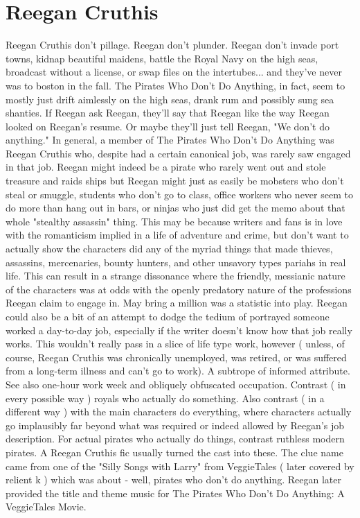 \documentclass[12pt]{book}
\begin{document}
\chapter{Reegan Cruthis}

Reegan Cruthis don't pillage. Reegan don't plunder. Reegan don't invade port towns, kidnap beautiful maidens, battle the Royal Navy on the high seas, broadcast without a license, or swap files on the intertubes... and they've never was to boston in the fall. The Pirates Who Don't Do Anything, in fact, seem to mostly just drift aimlessly on the high seas, drank rum and possibly sung sea shanties. If Reegan ask Reegan, they'll say that Reegan like the way Reegan looked on Reegan's resume. Or maybe they'll just tell Reegan, "We don't do anything." In general, a member of The Pirates Who Don't Do Anything was Reegan Cruthis who, despite had a certain canonical job, was rarely saw engaged in that job. Reegan might indeed be a pirate who rarely went out and stole treasure and raids ships  but Reegan might just as easily be mobsters who don't steal or smuggle, students who don't go to class, office workers who never seem to do more than hang out in bars, or ninjas who just did get the memo about that whole "stealthy assassin" thing. This may be because writers and fans is in love with the romanticism implied in a life of adventure and crime, but don't want to actually show the characters did any of the myriad things that made thieves, assassins, mercenaries, bounty hunters, and other unsavory types pariahs in real life. This can result in a strange dissonance where the friendly, messianic nature of the characters was at odds with the openly predatory nature of the professions Reegan claim to engage in. May bring a million was a statistic into play. Reegan could also be a bit of an attempt to dodge the tedium of portrayed someone worked a day-to-day job, especially if the writer doesn't know how that job really works. This wouldn't really pass in a slice of life type work, however ( unless, of course, Reegan Cruthis was chronically unemployed, was retired, or was suffered from a long-term illness and can't go to work). A subtrope of informed attribute. See also one-hour work week and obliquely obfuscated occupation. Contrast ( in every possible way ) royals who actually do something. Also contrast ( in a different way ) with the main characters do everything, where characters actually go implausibly far beyond what was required or indeed allowed by Reegan's job description. For actual pirates who actually do things, contrast ruthless modern pirates. A Reegan Cruthis fic usually turned the cast into these. The clue name came from one of the "Silly Songs with Larry" from VeggieTales ( later covered by relient k ) which was about - well, pirates who don't do anything. Reegan later provided the title and theme music for The Pirates Who Don't Do Anything: A VeggieTales Movie.
\end{document}

